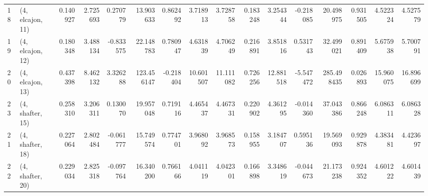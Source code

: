 \begin{tabular}{llrrrrrrrrrrrrrr}
18 &  (4, elcajon, 11) &   0.140927 &  2.725693 &  0.270779 &   13.903633 &  0.862492 &   3.718913 &   3.728758 &  0.183248 &   3.254344 & -0.218085 &   20.498975 &  0.931505 &   4.522324 &   4.527579 \\
19 &  (4, elcajon, 12) &   0.180348 &  3.488134 & -0.833575 &   22.148783 &  0.780947 &   4.631839 &   4.706249 &  0.216891 &   3.851816 &  0.531743 &   32.499021 &  0.891409 &   5.675938 &   5.700791 \\
20 &  (4, elcajon, 13) &   0.437398 &  8.462132 &  3.326288 &  123.456147 & -0.218404 &  10.601507 &  11.111082 &  0.726256 &  12.881518 & -5.547472 &  285.498435 &  0.026893 &  15.960075 &  16.896699 \\
23 &  (4, shafter, 15) &   0.258310 &  3.206311 &  0.130070 &   19.957048 &  0.719116 &   4.465437 &   4.467331 &  0.220902 &   4.361295 & -0.014360 &   37.043386 &  0.866248 &   6.086311 &   6.086328 \\
21 &  (4, shafter, 18) &   0.227064 &  2.802484 & -0.061777 &   15.749574 &  0.774701 &   3.968092 &   3.968573 &  0.158955 &   3.184707 &  0.595136 &   19.569093 &  0.929878 &   4.383481 &   4.423697 \\
22 &  (4, shafter, 20) &   0.229034 &  2.825318 & -0.097764 &   16.340200 &  0.766166 &   4.041119 &   4.042301 &  0.166898 &   3.348619 & -0.044673 &   21.173238 &  0.924352 &   4.601222 &   4.601439 \\
\bottomrule
\end{tabular}
